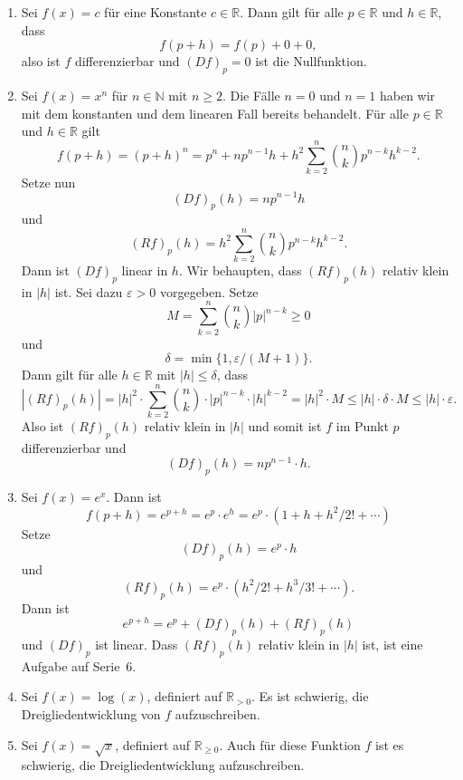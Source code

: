 \documentclass[../main.tex]{subfiles}
\begin{document}
\begin{examples}
  \leavevmode
  \begin{enumerate}[(1)]
    \item Sei $f(x) = c$ für eine
      Konstante $c \in \mathbb{R}$.
      Dann gilt für alle $p \in \mathbb{R}$ 
      und $h \in \mathbb{R}$, dass
      \[
        f(p + h) = f(p) + 0 + 0,
      \]
      also ist $f$ differenzierbar und
      ${(Df)}_p = 0$ ist die Nullfunktion.
    \item Sei $f(x) = x^n$ für $n \in \mathbb{N}$
      mit $n \geq 2$. Die Fälle $n = 0$ und $n = 1$ 
      haben wir mit dem konstanten und dem linearen
      Fall bereits behandelt.
      Für alle $p \in \mathbb{R}$ und
      $h \in \mathbb{R}$ gilt
      \[
        f(p + h) = {(p + h)}^n
        = p^n + np^{n-1}h + h^2 \sum_{k=2}^{n} \binom{n}{k}
        p^{n-k}h^{k-2}.
      \]
      Setze nun
      \[
        {(Df)}_p(h) = np^{n-1}h
      \]
      und
      \[
        {(Rf)}_p(h) = h^2 \sum_{k=2}^{n} \binom{n}{k} p^{n-k}h^{k-2}.
      \]
      Dann ist ${(Df)}_p$ linear in $h$.
      Wir behaupten, dass ${(Rf)}_p(h)$ relativ
      klein in $|h|$ ist.
      Sei dazu $\varepsilon > 0$ vorgegeben.
      Setze
      \[
        M = \sum_{k=2}^{n} \binom{n}{k}|p|^{n-k} \geq 0
      \]
      und
      \[
        \delta = \min \{1, \varepsilon / (M + 1)\}.
      \]
      Dann gilt für alle $h \in \mathbb{R}$ 
      mit $|h| \leq \delta$,
      dass
      \[
        |{(Rf)}_p(h)| = |h|^2 \cdot \sum_{k=2}^{n} 
        \binom{n}{k} \cdot |p|^{n-k} \cdot |h|^{k-2}
                 = |h|^2 \cdot M
                 \leq |h| \cdot \delta \cdot M 
                 \leq|h| \cdot  \varepsilon.
      \]
      Also ist ${(Rf)}_p(h)$ relativ klein in $|h|$ 
      und somit ist $f$ im Punkt $p$ differenzierbar und
      \[
        {(Df)}_p(h) = n p^{n-1} \cdot h.
      \]
    \item Sei $f(x) = e^x$. Dann ist
      \[
        f(p + h) = e^{p+h} = e^p \cdot e^h
        = e^p \cdot (1  +h + h^2/2! + \cdots)
      \]
      Setze
      \[
        {(Df)}_p(h) = e^p \cdot h
      \]
      und
      \[
        {(Rf)}_p(h) = e^p \cdot (h^2/2! + h^3/3! + \cdots).
      \]
      Dann ist
      \[
        e^{p+h} = e^p + {(Df)}_p(h) + {(Rf)}_p(h)
      \]
      und ${(Df)}_p$ ist linear.
      Dass ${(Rf)}_p(h)$ relativ klein
      in $|h|$ ist, ist eine Aufgabe auf Serie~6.
    \item Sei $f(x) = \log(x)$, definiert auf
      $\mathbb{R}_{>0}$.
      Es ist schwierig, die Dreigliedentwicklung
      von $f$ aufzuschreiben.
    \item Sei $f(x) = \sqrt x$, definiert auf
      $\mathbb{R}_{\geq 0}$.
      Auch für diese Funktion $f$ ist es schwierig,
      die Dreigliedentwicklung aufzuschreiben.
  \end{enumerate}
\end{examples}
\end{document}
